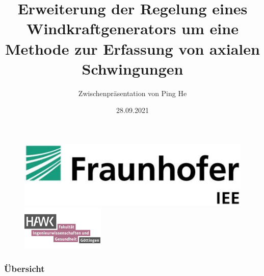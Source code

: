 \documentclass[serif,11pt, xcolor=table]{beamer}
\title[{\sc Masterarbeit } \hspace{0.8cm} \insertframenumber/\inserttotalframenumber]{{\sc \large{Erweiterung der Regelung eines Windkraftgenerators um eine Methode zur Erfassung von axialen Schwingungen}}}
\author[Ping He  --- {\sc 28.09.2021}]{{Zwischenpräsentation von Ping He}}
\date{28.09.2021}
\begin{document}
	
	
	\begin{figure}
		\centering
		\vspace{0.1cm}
		\includegraphics[scale=0.2]{Abbildungen/Logo.jpg}
		\hspace{1in}
		\includegraphics[scale=0.5]{Abbildungen/HAWKLogo.jpg}
		\titlepage
	\end{figure}
	
	
	
	\begin{frame}
		\frametitle{Übersicht}
		\tableofcontents
	\end{frame}
\end{document}
